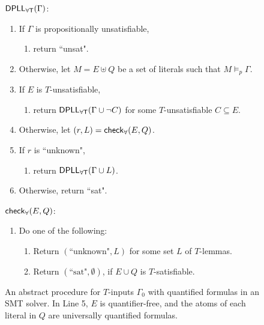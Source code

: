 \documentclass{easychair}
\begin{document}
\begin{figure}[t]
\begin{framed}
\begin{internallinenumbers}
$\small\mathsf{DPLL_{\forall T}}( \Gamma )$:
\begin{enumerate}
\item[\ ] If $\Gamma$ is propositionally unsatisfiable,
\begin{enumerate}
\item[\ ] return ``unsat".
\end{enumerate}
\item[\ ] Otherwise, let $M = E \uplus Q$ be a set of literals such that $M \models_p \Gamma$.
\item[\ ] If $E$ is $T$-unsatisfiable,
\begin{enumerate}
\item[\ ] return $\small\mathsf{DPLL_{\forall T}}( \Gamma \cup \neg C )$ for some $T$-unsatisfiable $C \subseteq E$.
\end{enumerate}
\item[\ ] Otherwise, let $( r, L ) = \small\mathsf{check}_\forall( E, Q )$.
\item[\ ] If $r$ is ``unknown",
\begin{enumerate}
\item[\ ] return $\small\mathsf{DPLL_{\forall T}}( \Gamma \cup L )$.
\end{enumerate}
\item[\ ] Otherwise, return ``sat".
\end{enumerate}
$\small\mathsf{check}_\forall( E, Q )$:
\begin{enumerate}
\item[\ ] Do one of the following:
\begin{enumerate}
\item[\ ] Return $( \text{``unknown"}, L )$ for some set $L$ of $T$-lemmas.
\item[\ ] Return $( \text{``sat"}, \emptyset )$, if $E \cup Q$ is $T$-satisfiable.
\end{enumerate}
\end{enumerate}
\end{internallinenumbers}
\end{framed}
\vspace{-2ex}
\caption{An abstract procedure for $T$-inputs $\Gamma_0$ with quantified formulas in an SMT solver.
In Line 5, $E$ is quantifier-free, and the atoms of each literal in $Q$ are universally quantified formulas.
\label{fig:smtq}}
\end{figure}
\end{document}
